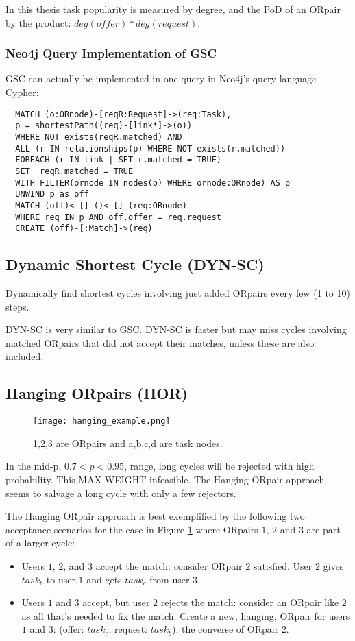 \documentclass[main.tex]{subfiles}
\begin{document}
In this thesis task popularity is measured by degree, and the PoD of an ORpair by the product: $deg(offer) * deg(request)$.

\subsubsection{Neo4j Query Implementation of GSC}
GSC can actually be implemented in one query in Neo4j's query-language Cypher:

\begin{verbatim}
  MATCH (o:ORnode)-[reqR:Request]->(req:Task),
  p = shortestPath((req)-[link*]->(o))
  WHERE NOT exists(reqR.matched) AND
  ALL (r IN relationships(p) WHERE NOT exists(r.matched))
  FOREACH (r IN link | SET r.matched = TRUE)
  SET  reqR.matched = TRUE
  WITH FILTER(ornode IN nodes(p) WHERE ornode:ORnode) AS p
  UNWIND p as off
  MATCH (off)<-[]-()<-[]-(req:ORnode)
  WHERE req IN p AND off.offer = req.request
  CREATE (off)-[:Match]->(req)
\end{verbatim}

\subsection{Dynamic Shortest Cycle (DYN-SC)}
Dynamically find shortest cycles involving just added ORpairs every few (1 to 10) steps.

DYN-SC is very similar to GSC. DYN-SC is faster but may miss cycles involving matched ORpairs that did not accept their matches, unless these are also included.

\subsection{Hanging ORpairs (HOR)}
\begin{figure}
  \texttt{[image: hanging\_example.png]}
  \caption{1,2,3 are ORpairs and a,b,c,d are task nodes.}
  \label{hanging_example}
\end{figure}

In the mid-p, $0.7 < p < 0.95$, range, long cycles will be rejected with high probability. This MAX-WEIGHT infeasible. The Hanging ORpair approach seems to salvage a long cycle with only a few rejectors.

The Hanging ORpair approach is best exemplified by the following two acceptance scenarios for the case in Figure \ref{hanging_example} where ORpairs $1$, $2$ and $3$ are part of a larger cycle:
\begin{itemize}
  \item Users $1$, $2$, and $3$ accept the match: consider ORpair $2$ satisfied. User $2$ gives $task_b$ to user $1$ and gets $task_c$ from user $3$.
  \item Users $1$ and $3$ accept, but user $2$ rejects the match: consider an ORpair like $2$ as all that's needed to fix the match. Create a new, hanging, ORpair for users $1$ and $3$: (offer: $task_c$, request: $task_b$), the converse of ORpair $2$.
\end{itemize}
\end{document}
